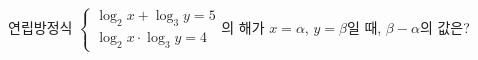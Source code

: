 연립방정식 $\begin{cases} \log_2 x+\log_3 y=5 \\ \log_2 x\cdot\log_3 y=4 \end{cases}$의 해가 $x=\alpha$, $y=\beta$일 때, $\beta-\alpha$의 값은? \dmcondfill{$\alpha<\beta$}{}
